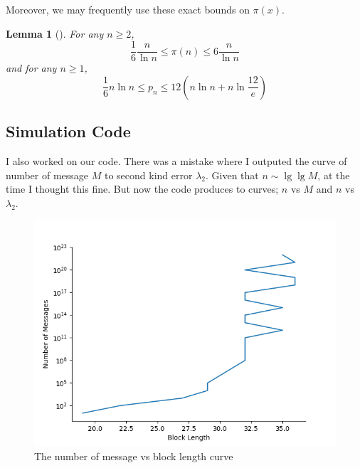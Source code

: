 \documentclass{article}
\newtheorem{lemma}{Lemma}
\begin{document}
Moreover, we may frequently use these exact bounds on \(\pi(x)\).
\begin{lemma}[\cite{apostol}]
	For any \(n \geq 2\), 
	\begin{equation*}
		\dfrac{1}{6} \dfrac{n}{\ln n} \leq \pi(n) \leq 6 \dfrac{n}{\ln n}
	\end{equation*}
	and for any \(n \geq 1\),
	\begin{equation*}
		\dfrac{1}{6} n \ln n \leq p_n \leq 12 (n \ln n + n \ln \frac{12}{e})
	\end{equation*}
\end{lemma}
\subsection{Simulation Code}
I also worked on our code. There was a mistake where I outputed the curve of number of message \(M\)  to second kind error  \(\lambda_2\). Given that \(n \sim \lg \lg M\), at the time I thought this fine. But now the code produces to curves; \(n\) vs \(M\) and \(n\) vs \(\lambda_2\). 
\begin{figure}
	\includegraphics*[height = 0.4 \textheight]{MessageVsBlocklength.png}
	\caption{The number of message vs block length curve}
\end{figure}
\end{document}

